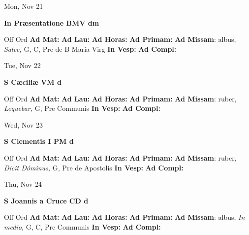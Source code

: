\documentclass[10pt]{memoir}
\begin{document}
\begin{center}
\begin{minipage}{3.5in}
\vspace{2em}
\begin{center}Mon, Nov 21
\end{center}
\textbf{ \large In Præsentatione BMV
\textnormal{\normalsize dm}}

\begin{justify}Off Ord
\textbf{Ad Mat: }
\textbf{Ad Lau: }
\textbf{Ad Horas: }
\textbf{Ad Primam: }\textbf{Ad Missam}: albus, \textit{Salve,} G, C, Pre de B Maria Virg
\textbf{In Vesp: }
\textbf{Ad Compl: }
\end{justify}
\end{minipage}
\end{center}

\begin{center}
\begin{minipage}{3.5in}
\vspace{2em}
\begin{center}Tue, Nov 22
\end{center}
\textbf{ \large S Cæciliæ VM
\textnormal{\normalsize d}}

\begin{justify}Off Ord
\textbf{Ad Mat: }
\textbf{Ad Lau: }
\textbf{Ad Horas: }
\textbf{Ad Primam: }\textbf{Ad Missam}: ruber, \textit{Loquebar,} G, Pre Communis
\textbf{In Vesp: }
\textbf{Ad Compl: }
\end{justify}
\end{minipage}
\end{center}

\begin{center}
\begin{minipage}{3.5in}
\vspace{2em}
\begin{center}Wed, Nov 23
\end{center}
\textbf{ \large S Clementis I PM
\textnormal{\normalsize d}}

\begin{justify}Off Ord
\textbf{Ad Mat: }
\textbf{Ad Lau: }
\textbf{Ad Horas: }
\textbf{Ad Primam: }\textbf{Ad Missam}: ruber, \textit{Dicit Dóminus,} G, Pre de Apostolis
\textbf{In Vesp: }
\textbf{Ad Compl: }
\end{justify}
\end{minipage}
\end{center}

\begin{center}
\begin{minipage}{3.5in}
\vspace{2em}
\begin{center}Thu, Nov 24
\end{center}
\textbf{ \large S Joannis a Cruce CD
\textnormal{\normalsize d}}

\begin{justify}Off Ord
\textbf{Ad Mat: }
\textbf{Ad Lau: }
\textbf{Ad Horas: }
\textbf{Ad Primam: }\textbf{Ad Missam}: albus, \textit{In medio,} G, C, Pre Communis
\textbf{In Vesp: }
\textbf{Ad Compl: }
\end{justify}
\end{minipage}
\end{center}
\end{document}
